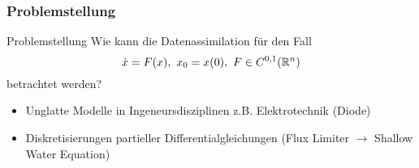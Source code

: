 \begin{frame}[<+->]
  \frametitle{Problemstellung}
  \begin{block}{Problemstellung}
  \centering
	Wie kann die Datenassimilation für den Fall
	\[
	  \dot{x} = F(x),~ x_0 = x(0),~F\in C^{0,1}(\mathbb R^n)
	\]
	betrachtet werden?
  \end{block}
   \begin{itemize}
    \item Unglatte Modelle in Ingeneursdisziplinen z.B. Elektrotechnik (Diode)
    \item Diskretisierungen partieller Differentialgleichungen (Flux Limiter $\to$ Shallow Water Equation)
   \end{itemize}


\end{frame} 
